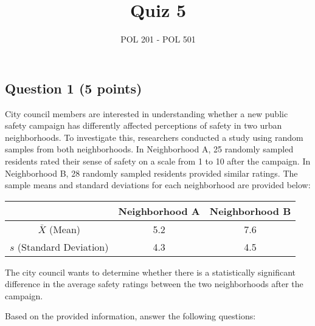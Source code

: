 \documentclass{article}
\title{Quiz 5}
\author{POL 201 - POL 501}
\date{}
\begin{document}
\maketitle

\subsection*{Question 1 (5 points)}
City council members are interested in understanding whether a new public safety campaign has differently affected perceptions of safety in two urban neighborhoods. To investigate this, researchers conducted a study using random samples from both neighborhoods. In Neighborhood A, 25 randomly sampled residents rated their sense of safety on a scale from 1 to 10 after the campaign. In Neighborhood B, 28 randomly sampled residents provided similar ratings. The sample means and standard deviations for each neighborhood are provided below:

\begin{center}
\renewcommand{\arraystretch}{1.5} %
\begin{tabular}{c|c|c}
\hline
     & \textbf{Neighborhood A} & \textbf{Neighborhood B} \\ \hline
  $\bar{X}$ (Mean) &  5.2 & 7.6 \\ \hline
  $s$ (Standard Deviation) &  4.3 &  4.5 \\ \hline 
\end{tabular}
\end{center}


The city council wants to determine whether there is a statistically significant difference in the average safety ratings between the two neighborhoods after the campaign.

Based on the provided information, answer the following questions:
\end{document}
